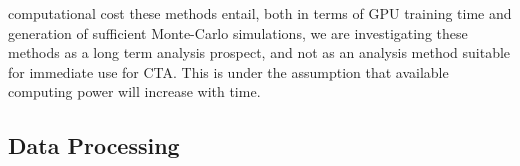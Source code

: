 computational cost these methods entail, both in terms of GPU training time and generation of sufficient Monte-Carlo simulations, we are investigating these methods as a long term analysis prospect, and not as an analysis method suitable for immediate use for CTA. This is under the assumption that available computing power will increase with time.
\begin{table}[ht]
\centering
{}
\caption{Parameters used in our two datasets. In the point source run, the point source $\gamma$-rays are mixed in equal ratios with the diffuse proton and diffuse electron events. In the diffuse run, all three event classes are diffuse.}
\label{table:Datasetparams}
\end{table}

\subsection{Data Processing}

